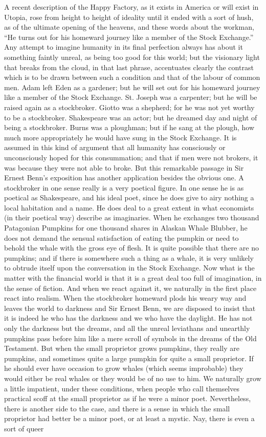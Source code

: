 \documentclass{book}
\begin{document}
A recent description of the Happy Factory, as it exists in America or will exist in Utopia, rose from height to height of ideality until it ended with a sort of hush, as of the ultimate opening of the heavens, and these words about the workman, “He turns out for his homeward journey like a member of the Stock Exchange.” Any attempt to imagine humanity in its final perfection always has about it something faintly unreal, as being too good for this world; but the visionary light that breaks from the cloud, in that last phrase, accentuates clearly the contrast which is to be drawn between such a condition and that of the labour of common men. Adam left Eden as a gardener; but he will set out for his homeward journey like a member of the Stock Exchange. St. Joseph was a carpenter; but he will be raised again as a stockbroker. Giotto was a shepherd; for he was not yet worthy to be a stockbroker. Shakespeare was an actor; but he dreamed day and night of being a stockbroker. Burns was a ploughman; but if he sang at the plough, how much more appropriately he would have sung in the Stock Exchange. It is assumed in this kind of argument that all humanity has consciously or unconsciously hoped for this consummation; and that if men were not brokers, it was because they were not able to broke. But this remarkable passage in Sir Ernest Benn’s exposition has another application besides the obvious one. A stockbroker in one sense really is a very poetical figure. In one sense he is as poetical as Shakespeare, and his ideal poet, since he does give to airy nothing a local habitation and a name. He does deal to a great extent in what economists (in their poetical way) describe as imaginaries. When he exchanges two thousand Patagonian Pumpkins for one thousand shares in Alaskan Whale Blubber, he does not demand the sensual satisfaction of eating the pumpkin or need to behold the whale with the gross eye of flesh. It is quite possible that there are no pumpkins; and if there is somewhere such a thing as a whale, it is very unlikely to obtrude itself upon the conversation in the Stock Exchange. Now what is the matter with the financial world is that it is a great deal too full of imagination, in the sense of fiction. And when we react against it, we naturally in the first place react into realism. When the stockbroker homeward plods his weary way and leaves the world to darkness and Sir Ernest Benn, we are disposed to insist that it is indeed he who has the darkness and we who have the daylight. He has not only the darkness but the dreams, and all the unreal leviathans and unearthly pumpkins pass before him like a mere scroll of symbols in the dreams of the Old Testament. But when the small proprietor grows pumpkins, they really are pumpkins, and sometimes quite a large pumpkin for quite a small proprietor. If he should ever have occasion to grow whales (which seems improbable) they would either be real whales or they would be of no use to him. We naturally grow a little impatient, under these conditions, when people who call themselves practical scoff at the small proprietor as if he were a minor poet. Nevertheless, there is another side to the case, and there is a sense in which the small proprietor had better be a minor poet, or at least a mystic. Nay, there is even a sort of queer 
\end{document}
